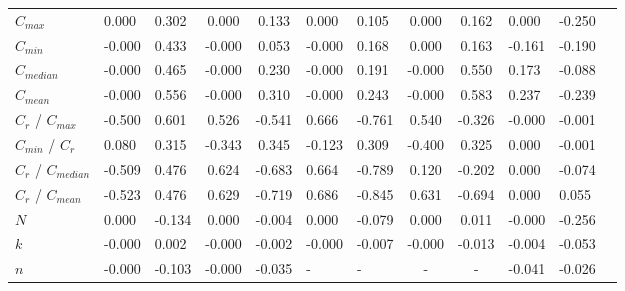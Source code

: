 \begin{tabular}{lggccggccggg}
$C_{max}$             &              0.000  &           0.302  &              0.000  &           0.133  &              0.000  &           0.105  &              0.000  &         0.162 &  0.000 &        -0.250 \\
$C_{min}$             &             -0.000  &           0.433  &             -0.000  &           0.053  &             -0.000  &           0.168  &              0.000  &         0.163 & -0.161 &        -0.190 \\
$C_{median}$          &             -0.000  &           0.465  &             -0.000  &           0.230  &             -0.000  &           0.191  &             -0.000  &         0.550 &  0.173 &        -0.088 \\
$C_{mean}$            &             -0.000  &           0.556  &             -0.000  &           0.310  &             -0.000  &           0.243  &             -0.000  &         0.583 &  0.237 &        -0.239 \\
$C_r$ / $C_{max}$     &             -0.500  &           0.601  &              0.526  &          -0.541  &              0.666  &          -0.761  &              0.540  &        -0.326 & -0.000 &        -0.001 \\
$C_{min}$ / $C_r$     &              0.080  &           0.315  &             -0.343  &           0.345  &             -0.123  &           0.309  &             -0.400  &         0.325 &  0.000 &        -0.001 \\
$C_r$ / $C_{median}$  &             -0.509  &           0.476  &              0.624  &          -0.683  &              0.664  &          -0.789  &              0.120  &        -0.202 &  0.000 &        -0.074 \\
$C_r$ / $C_{mean}$    &             -0.523  &           0.476  &              0.629  &          -0.719  &              0.686  &          -0.845  &              0.631  &        -0.694 &  0.000 &         0.055 \\
$N$                   &              0.000  &          -0.134  &              0.000  &          -0.004  &              0.000  &          -0.079  &              0.000  &         0.011 & -0.000 &        -0.256 \\
$k$                   &             -0.000  &           0.002  &             -0.000  &          -0.002  &             -0.000  &          -0.007  &             -0.000  &        -0.013 & -0.004 &        -0.053 \\
$n$                   &             -0.000  &          -0.103  &             -0.000  &          -0.035  &                  -  &               -  &                  -  &             - & -0.041 &        -0.026 \\

\end{tabular}
